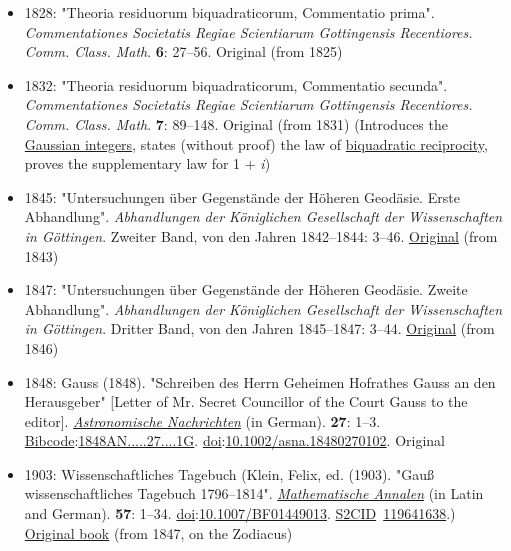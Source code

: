 \begin{itemize}
  \begin{itemize}
  \tightlist
  \item
    {\href{https://www.gutenberg.org/files/36856/36856-pdf.pdf}{\emph{General Investigations of Curved Surfaces}} {(PDF)}. Translated by J. C. Morehead and A. M. Hiltebeitel. The Princeton University Library. 1902.{}}
  \end{itemize}
\item
  {1828: "Theoria residuorum biquadraticorum, Commentatio prima". \emph{Commentationes Societatis Regiae Scientiarum Gottingensis Recentiores. Comm. Class. Math}. \textbf{6}: {27--}56.{} Original (from 1825)}
\item
  {1832: "Theoria residuorum biquadraticorum, Commentatio secunda". \emph{Commentationes Societatis Regiae Scientiarum Gottingensis Recentiores. Comm. Class. Math}. \textbf{7}: {89--}148.{} Original (from 1831) (Introduces the \href{https://en.wikipedia.org/wiki/Gaussian_integers}{Gaussian integers}, states (without proof) the law of \href{https://en.wikipedia.org/wiki/Biquadratic_reciprocity}{biquadratic reciprocity}, proves the supplementary law for 1 + \emph{i})}
\item
  {1845: "Untersuchungen über Gegenstände der Höheren Geodäsie. Erste Abhandlung". \emph{Abhandlungen der Königlichen Gesellschaft der Wissenschaften in Göttingen}. Zweiter Band, von den Jahren 1842--1844: {3--}46.{} \href{https://gdz.sub.uni-goettingen.de/id/PPN250442582_0002}{Original} (from 1843)}
\item
  {1847: "Untersuchungen über Gegenstände der Höheren Geodäsie. Zweite Abhandlung". \emph{Abhandlungen der Königlichen Gesellschaft der Wissenschaften in Göttingen}. Dritter Band, von den Jahren 1845--1847: {3--}44.{} \href{https://gdz.sub.uni-goettingen.de/id/PPN250442582_0003}{Original} (from 1846)}
\item
  {1848: Gauss (1848). "Schreiben des Herrn Geheimen Hofrathes Gauss an den Herausgeber" {{[}}Letter of Mr. Secret Councillor of the Court Gauss to the editor{{]}}. \emph{\href{https://en.wikipedia.org/wiki/Astronomische_Nachrichten}{Astronomische Nachrichten}} (in German). \textbf{27}: {1--}3. \href{https://en.wikipedia.org/wiki/Bibcode_(identifier)}{Bibcode}:\href{https://ui.adsabs.harvard.edu/abs/1848AN.....27....1G}{1848AN.....27....1G}. \href{https://en.wikipedia.org/wiki/Doi_(identifier)}{doi}:\href{https://doi.org/10.1002\%2Fasna.18480270102}{10.1002/asna.18480270102}.{} Original}
\item
  {1903: Wissenschaftliches Tagebuch (Klein, Felix, ed. (1903). "Gauß\textquotesingle{} wissenschaftliches Tagebuch 1796--1814". \emph{\href{https://en.wikipedia.org/wiki/Mathematische_Annalen}{Mathematische Annalen}} (in Latin and German). \textbf{57}: {1--}34. \href{https://en.wikipedia.org/wiki/Doi_(identifier)}{doi}:\href{https://doi.org/10.1007\%2FBF01449013}{10.1007/BF01449013}. \href{https://en.wikipedia.org/wiki/S2CID_(identifier)}{S2CID}{~}\href{https://api.semanticscholar.org/CorpusID:119641638}{119641638}.{}) \href{https://gdz.sub.uni-goettingen.de/id/DE-611-HS-3382323}{Original book} (from 1847, on the Zodiacus)}


\end{itemize}

